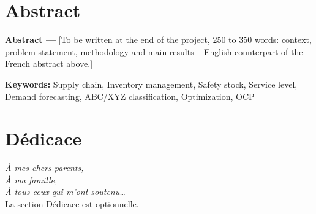 \documentclass[12pt, a4paper, oneside]{report}
\begin{document}
\chapter*{Abstract}

\begin{tcolorbox}[colback=iacsLight!30, colframe=iacsPrimary, boxrule=0.5pt, arc=3pt]
  \textbf{Abstract ---}
  [To be written at the end of the project, 250 to 350 words: context, problem
  statement, methodology and main results -- English counterpart of the French
  abstract above.]

  \vspace{6pt}
  \textbf{Keywords:} Supply chain, Inventory management, Safety stock,
  Service level, Demand forecasting, ABC/XYZ classification, Optimization, OCP
\end{tcolorbox}

\newpage


\chapter*{Dédicace}
\thispagestyle{empty}

\vspace*{4cm}
\begin{flushright}
  \begin{minipage}{0.6\textwidth}
    \begin{flushright}
      {\large\itshape\color{iacsSecondary}
        À mes chers parents,\\[4pt]
        À ma famille,\\[4pt]
        À tous ceux qui m'ont soutenu\ldots\\[20pt]
      }
      {\normalsize\color{iacsGray}
        La section Dédicace est optionnelle.
      }
    \end{flushright}
  \end{minipage}
\end{flushright}

\newpage


\end{document}

